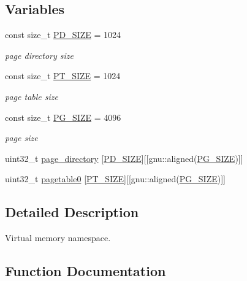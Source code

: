 \subsection*{Variables}
\begin{DoxyCompactItemize}
\item 
const size\+\_\+t \hyperlink{namespace_v_m_a9a281e32930026b0c172914c1991ee6c}{P\+D\+\_\+\+S\+I\+ZE} = 1024
\begin{DoxyCompactList}\small\item\em page directory size \end{DoxyCompactList}\item 
const size\+\_\+t \hyperlink{namespace_v_m_a64558f9565f1bb4a12eb2ddd7b7c1106}{P\+T\+\_\+\+S\+I\+ZE} = 1024
\begin{DoxyCompactList}\small\item\em page table size \end{DoxyCompactList}\item 
const size\+\_\+t \hyperlink{namespace_v_m_a3afc454e973b965743e84ed10d74161c}{P\+G\+\_\+\+S\+I\+ZE} = 4096
\begin{DoxyCompactList}\small\item\em page size \end{DoxyCompactList}\item 
uint32\+\_\+t \hyperlink{namespace_v_m_a3580800d6decdb1a45fe063c10288201}{page\+\_\+directory} \mbox{[}\hyperlink{namespace_v_m_a9a281e32930026b0c172914c1991ee6c}{P\+D\+\_\+\+S\+I\+ZE}\mbox{]}\mbox{[}\mbox{[}gnu\+::aligned(\hyperlink{namespace_v_m_a3afc454e973b965743e84ed10d74161c}{P\+G\+\_\+\+S\+I\+ZE})\mbox{]}\mbox{]}
\item 
uint32\+\_\+t \hyperlink{namespace_v_m_a4b6dc3e8c1df1e3ff30e6585b9da9937}{pagetable0} \mbox{[}\hyperlink{namespace_v_m_a64558f9565f1bb4a12eb2ddd7b7c1106}{P\+T\+\_\+\+S\+I\+ZE}\mbox{]}\mbox{[}\mbox{[}gnu\+::aligned(\hyperlink{namespace_v_m_a3afc454e973b965743e84ed10d74161c}{P\+G\+\_\+\+S\+I\+ZE})\mbox{]}\mbox{]}
\end{DoxyCompactItemize}


\subsection{Detailed Description}
Virtual memory namespace. 

\subsection{Function Documentation}
\mbox{\label{namespace_v_m_a722753d2c3fafcd36dad99fb1fa1eaf3}} 
